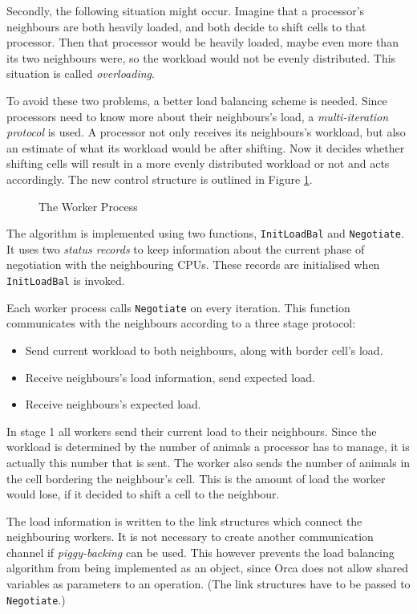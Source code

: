Secondly, the following situation might occur. Imagine that a processor's
neighbours are both heavily loaded, and both decide to shift cells to
that processor. Then that processor would be heavily loaded, maybe even more
than its two neighbours were, so the workload would not be evenly
distributed. This situation is called {\em overloading}.

To avoid these two problems, a better load balancing scheme is needed.
Since processors need to know more about their neighbours's load, a
{\em multi-iteration protocol} is used. A processor not only receives
its neighbours's workload, but also an estimate of what its workload
would be after shifting. Now it decides whether shifting cells will
result in a more evenly distributed workload or not and acts
accordingly.  The new control structure is outlined in Figure
\ref{fWorker}.

\begin{figure}
\begin{tgrind}

\end{tgrind}
\caption{The Worker Process}
\label{fWorker}
\end{figure}

The algorithm is implemented using two functions,
{\tt InitLoadBal} and {\tt Negotiate}. It uses two {\em status records} to
keep information about the current phase of negotiation with the
neighbouring CPUs. These records are initialised when {\tt
InitLoadBal} is invoked.

Each worker process calls {\tt Negotiate} on every iteration. This
function communicates with the neighbours according to a three stage
protocol:
\begin{itemize}
        \item[1.] Send current workload to both neighbours, along
        with border cell's load.
        \item[2.] Receive neighbours's load information, send expected load.
        \item[3.] Receive neighbours's expected load.
\end{itemize}
In stage 1 all workers send their current load to their neighbours.
Since the workload is determined by the number of animals a processor
has to manage, it is actually this number that is sent. The worker also
sends the number of animals in the cell bordering the neighbour's cell.
This is the amount of load the worker would lose, if it decided to
shift a cell to the neighbour.

The load information is written to the link structures which connect the
neighbouring workers. It is not necessary to create another
communication channel if {\em piggy-backing} can be used. This however prevents
the load balancing algorithm from being implemented as an object, since
Orca does not allow shared variables as parameters to an
operation. (The link structures have to be passed to {\tt Negotiate}.)

